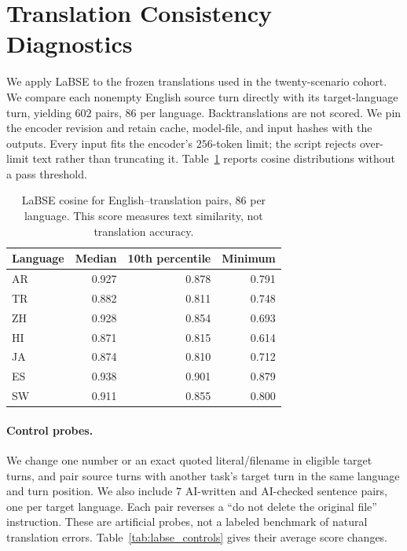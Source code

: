 \section{Translation Consistency Diagnostics}
\label{app:translation_quality}
We apply LaBSE \citep{feng2022labse} to the frozen translations used in
the twenty-scenario cohort. We compare each nonempty English source turn
directly with its target-language turn, yielding $602$ pairs, $86$ per
language. Backtranslations are not scored. We pin the encoder revision
and retain cache, model-file, and input hashes with the outputs.
Every input fits the encoder's $256$-token limit; the script rejects
over-limit text rather than truncating it. Table~\ref{tab:labse_pairs}
reports cosine distributions without a pass threshold.

\begin{table}[ht]
\centering\footnotesize
\begin{tabular*}{\columnwidth}{@{\extracolsep{\fill}}lrrr@{}}\toprule
Language & Median & 10th percentile & Minimum \\\midrule
AR & 0.927 & 0.878 & 0.791 \\
TR & 0.882 & 0.811 & 0.748 \\
ZH & 0.928 & 0.854 & 0.693 \\
HI & 0.871 & 0.815 & 0.614 \\
JA & 0.874 & 0.810 & 0.712 \\
ES & 0.938 & 0.901 & 0.879 \\
SW & 0.911 & 0.855 & 0.800 \\
\bottomrule\end{tabular*}
\caption{LaBSE cosine for English--translation pairs,
$86$ per language. This score measures text similarity, not translation accuracy.}
\label{tab:labse_pairs}
\end{table}

\paragraph{Control probes.} We change one number
or an exact quoted literal/filename in eligible target turns, and pair
source turns with another task's target turn in the same language
and turn position. We also include
$7$ AI-written and AI-checked sentence pairs, one per
target language. Each pair reverses a ``do not delete the original file''
instruction. These are artificial probes, not a labeled benchmark of natural
translation errors.
Table~\ref{tab:labse_controls} gives their average score changes.

